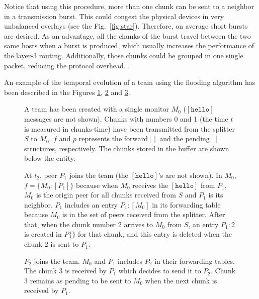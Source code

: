 Notice that using this procedure, more than one chunk can be sent to a
neighbor in a transmission burst. This could congest the physical
devices in very unbalanced overlays (see the Fig.~\ref{fig:star}). Therefore, on
average short bursts are desired. As an advantage, all the chunks of the burst travel between the two
same hosts when a burst is produced, which usually increases the performance of the layer-3
routing. Additionally, those chunks could be grouped in one single packet, reducing the protocol overhead.
.

An example of the temporal evolution of a team using the flooding
algorithm has been described in the Figures \ref{fig:team_0},
\ref{fig:team_1} and \ref{fig:team_2}.

\begin{figure}
  \caption{A team has been created with a single monitor $M_0$
    ($[\mathtt{hello}]$ messages are not shown). Chunks with numbers 0
    and 1 (the time $t$ is measured in chunks-time) have been
    transmitted from the splitter $S$ to $M_0$. $f$ and $p$ represents
    the $\text{forward}[]$ and the $\text{pending}[]$ structures,
    respectively. The chunks stored in the buffer are shown below the
    entity.} %
  \label{fig:team_0}
\end{figure}

\begin{figure}
  \caption{At $t_2$, peer $P_1$ joins the team (the
    $[\mathtt{hello}]$'s are not shown). In $M_0$, $f=\{M_0:[P_1]\}$
    because when $M_0$ receives the $[\mathtt{hello}]$ from $P_1$,
    $M_0$ is the origin peer for all chunks received from $S$ and
    $P_1$ is its neighbor. $P_1$ includes an entry $P_1:[M_0]$ in its
    forwarding table because $M_0$ is in the set of peers received
    from the splitter. After that, when the chunk number 2 arrives to
    $M_0$ from $S$, an entry $P_1:2$ is created in $P\{\}$ for that
    chunk, and this entry is deleted when the chunk 2 is sent to
    $P_1$.} %
  \label{fig:team_1}
\end{figure}

\begin{figure}
  \caption{$P_2$ joins the team. $M_0$ and $P_1$ includes $P_2$ in
    their forwarding tables. The chunk 3 is received by $P_1$ which
    decides to send it to $P_2$. Chunk 3 remains as pending to be sent
    to $M_0$ when the next chunk is received by
    $P_1$.} %
  \label{fig:team_2}
\end{figure}
    
